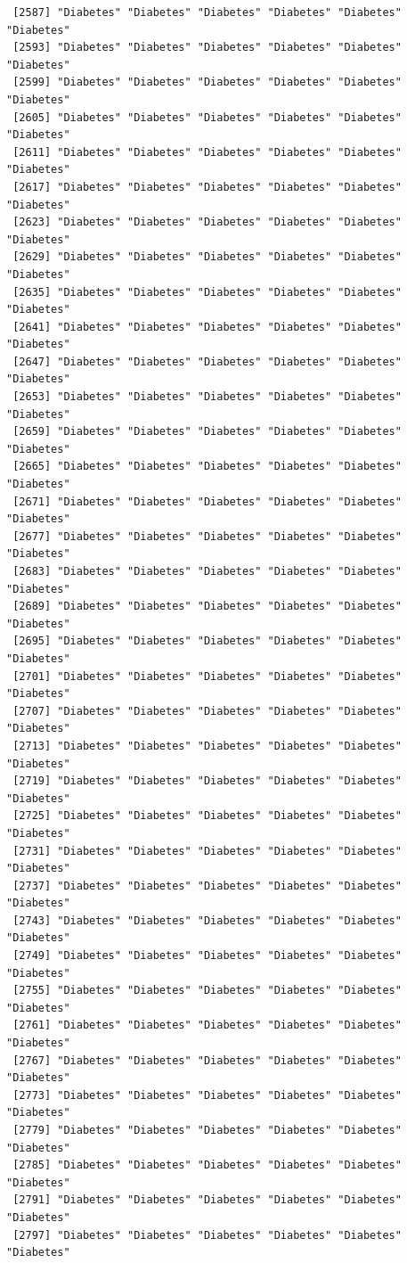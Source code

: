 \documentclass[
  letterpaper,
  DIV=11,
  numbers=noendperiod]{scrartcl}
\begin{document}
\begin{verbatim}
 [2587] "Diabetes" "Diabetes" "Diabetes" "Diabetes" "Diabetes" "Diabetes"
 [2593] "Diabetes" "Diabetes" "Diabetes" "Diabetes" "Diabetes" "Diabetes"
 [2599] "Diabetes" "Diabetes" "Diabetes" "Diabetes" "Diabetes" "Diabetes"
 [2605] "Diabetes" "Diabetes" "Diabetes" "Diabetes" "Diabetes" "Diabetes"
 [2611] "Diabetes" "Diabetes" "Diabetes" "Diabetes" "Diabetes" "Diabetes"
 [2617] "Diabetes" "Diabetes" "Diabetes" "Diabetes" "Diabetes" "Diabetes"
 [2623] "Diabetes" "Diabetes" "Diabetes" "Diabetes" "Diabetes" "Diabetes"
 [2629] "Diabetes" "Diabetes" "Diabetes" "Diabetes" "Diabetes" "Diabetes"
 [2635] "Diabetes" "Diabetes" "Diabetes" "Diabetes" "Diabetes" "Diabetes"
 [2641] "Diabetes" "Diabetes" "Diabetes" "Diabetes" "Diabetes" "Diabetes"
 [2647] "Diabetes" "Diabetes" "Diabetes" "Diabetes" "Diabetes" "Diabetes"
 [2653] "Diabetes" "Diabetes" "Diabetes" "Diabetes" "Diabetes" "Diabetes"
 [2659] "Diabetes" "Diabetes" "Diabetes" "Diabetes" "Diabetes" "Diabetes"
 [2665] "Diabetes" "Diabetes" "Diabetes" "Diabetes" "Diabetes" "Diabetes"
 [2671] "Diabetes" "Diabetes" "Diabetes" "Diabetes" "Diabetes" "Diabetes"
 [2677] "Diabetes" "Diabetes" "Diabetes" "Diabetes" "Diabetes" "Diabetes"
 [2683] "Diabetes" "Diabetes" "Diabetes" "Diabetes" "Diabetes" "Diabetes"
 [2689] "Diabetes" "Diabetes" "Diabetes" "Diabetes" "Diabetes" "Diabetes"
 [2695] "Diabetes" "Diabetes" "Diabetes" "Diabetes" "Diabetes" "Diabetes"
 [2701] "Diabetes" "Diabetes" "Diabetes" "Diabetes" "Diabetes" "Diabetes"
 [2707] "Diabetes" "Diabetes" "Diabetes" "Diabetes" "Diabetes" "Diabetes"
 [2713] "Diabetes" "Diabetes" "Diabetes" "Diabetes" "Diabetes" "Diabetes"
 [2719] "Diabetes" "Diabetes" "Diabetes" "Diabetes" "Diabetes" "Diabetes"
 [2725] "Diabetes" "Diabetes" "Diabetes" "Diabetes" "Diabetes" "Diabetes"
 [2731] "Diabetes" "Diabetes" "Diabetes" "Diabetes" "Diabetes" "Diabetes"
 [2737] "Diabetes" "Diabetes" "Diabetes" "Diabetes" "Diabetes" "Diabetes"
 [2743] "Diabetes" "Diabetes" "Diabetes" "Diabetes" "Diabetes" "Diabetes"
 [2749] "Diabetes" "Diabetes" "Diabetes" "Diabetes" "Diabetes" "Diabetes"
 [2755] "Diabetes" "Diabetes" "Diabetes" "Diabetes" "Diabetes" "Diabetes"
 [2761] "Diabetes" "Diabetes" "Diabetes" "Diabetes" "Diabetes" "Diabetes"
 [2767] "Diabetes" "Diabetes" "Diabetes" "Diabetes" "Diabetes" "Diabetes"
 [2773] "Diabetes" "Diabetes" "Diabetes" "Diabetes" "Diabetes" "Diabetes"
 [2779] "Diabetes" "Diabetes" "Diabetes" "Diabetes" "Diabetes" "Diabetes"
 [2785] "Diabetes" "Diabetes" "Diabetes" "Diabetes" "Diabetes" "Diabetes"
 [2791] "Diabetes" "Diabetes" "Diabetes" "Diabetes" "Diabetes" "Diabetes"
 [2797] "Diabetes" "Diabetes" "Diabetes" "Diabetes" "Diabetes" "Diabetes"

\end{verbatim}
\end{document}

